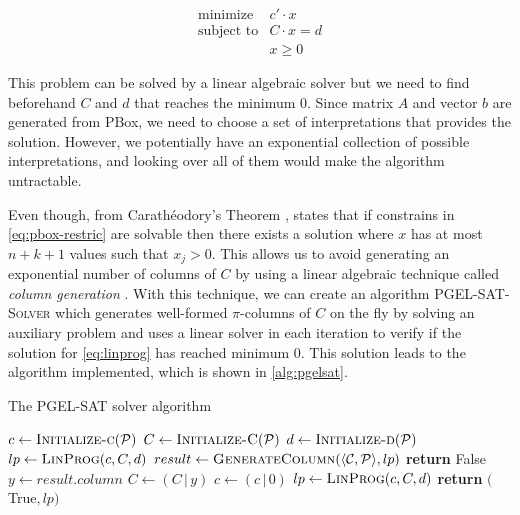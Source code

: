\begin{equation}
	\label{eq:linprog}
	\begin{array}{ll}
		\text{minimize}   & c' \cdot x    \\
		\text{subject to} & C \cdot x = d \\
		                  & x \geq 0
	\end{array}
\end{equation}

This problem can be solved by a linear algebraic solver but we need to find beforehand $C$ and $d$ that reaches the minimum 0. Since matrix $A$ and vector $b$ are generated from PBox, we need to choose a set of interpretations that provides the solution. However, we potentially have an exponential collection of possible interpretations, and looking over all of them would make the algorithm untractable. 

Even though, from Carathéodory's Theorem \citep{eckhoff1993helly}, \citet{Fin2020} states that if constrains in \autoref{eq:pbox-restric} are solvable then there exists  a solution where $x$ has at most $n + k + 1$ values such that $x_j > 0$. This allows us to avoid generating an exponential number of columns of $C$ by using a linear algebraic technique called \emph{column generation} \citep{gilmore1961linear,gilmore1963linear}. With this technique, we can create an algorithm \textsc{PGEL-SAT-Solver} which generates well-formed $\pi$-columns of $C$ on the fly by solving an auxiliary problem and uses a linear solver in each iteration to verify if the solution for \autoref{eq:linprog} has reached minimum 0. This solution leads to the algorithm implemented, which is shown in \autoref{alg:pgelsat}.

\begin{algorithm}
	\caption{The PGEL-SAT solver algorithm}
	\label{alg:pgelsat}
	\begin{algorithmic}[1]
		\State $c \gets \Call{Initialize-c}{\PP}$
		\State $C \gets \Call{Initialize-C}{\PP}$
		\State $d \gets \Call{Initialize-d}{\PP}$
		\Statex
		\State $lp \gets \Call{LinProg}{c, C, d}$
		\Statex
		\State $result \gets \Call{GenerateColumn}{\tuple{\CC, \PP}, lp}$
		\State \textbf{return} False 
		\EndIf
		\Statex
		\State $y \gets result.column$ 
		\State $C \gets ( C \, | \, y) $
		\State $c \gets (c \, | \, 0)$
		\State $lp \gets \Call{LinProg}{c, C, d}$
		\EndWhile
		\Statex
		\State \textbf{return} $($True$, lp)$ 
		\EndFunction
	\end{algorithmic}
\end{algorithm}

